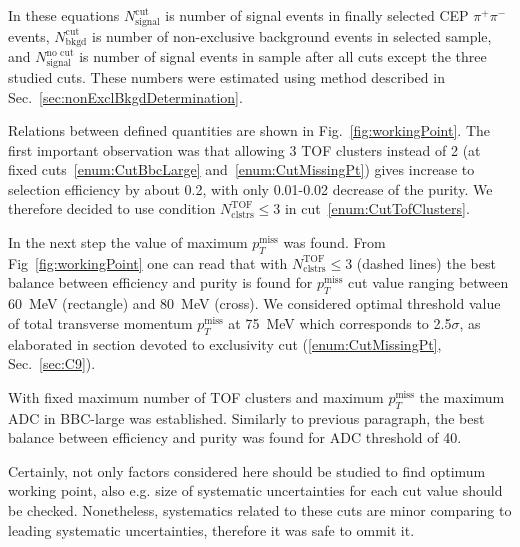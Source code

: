 In these equations $N_{\text{signal}}^{\text{cut}}$ is number of signal events in finally selected CEP $\pi^{+}\pi^{-}$ events, $N_{\text{bkgd}}^{\text{cut}}$ is number of non-exclusive background events in selected sample, and $N_{\text{signal}}^{\text{no~cut}}$ is number of signal events in sample after all cuts except the three studied cuts. These numbers were estimated using method described in Sec.~\ref{sec:nonExclBkgdDetermination}.

Relations between defined quantities are shown in Fig.~\ref{fig:workingPoint}. The first important observation was that allowing 3 TOF clusters instead of 2 (at fixed cuts~\ref{enum:CutBbcLarge} and~\ref{enum:CutMissingPt}) gives increase to selection efficiency by about 0.2, with only 0.01-0.02 decrease of the purity. We therefore decided to use condition $N^{\text{TOF}}_{\text{clstrs}}\leq 3$ in cut~\ref{enum:CutTofClusters}. 

In the next step the value of maximum $p_{T}^{\text{miss}}$ was found. From Fig~\ref{fig:workingPoint} one can read that with $N^{\text{TOF}}_{\text{clstrs}}\leq 3$ (dashed lines) the best balance between efficiency and purity is found for $p_{T}^{\text{miss}}$ cut value ranging between 60~MeV (rectangle) and 80~MeV (cross). We considered optimal threshold value of total transverse momentum $p_{T}^{\text{miss}}$ at 75~MeV which corresponds to 2.5$\sigma$, as elaborated in section devoted to exclusivity cut (\ref{enum:CutMissingPt}, Sec.~\ref{sec:C9}).

With fixed maximum number of TOF clusters and maximum $p_{T}^{\text{miss}}$ the maximum ADC in BBC-large was established. Similarly to previous paragraph, the best balance between efficiency and purity was found for ADC threshold of 40.

Certainly, not only factors considered here should be studied to find optimum working point, also e.g. size of systematic uncertainties for each cut value should be checked. Nonetheless, systematics related to these cuts are minor comparing to leading systematic uncertainties, therefore it was safe to ommit it.
